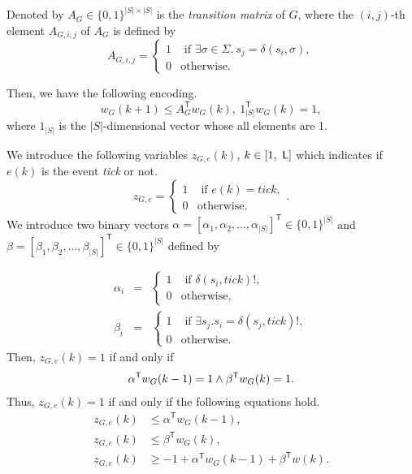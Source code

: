\documentclass{article}
\newcommand{\Len}{{\sf L}}
\begin{document}
Denoted by $A_G \in \{0, 1\}^{|S| \times |S|}$ is the \textit{transition matrix} of  $G$, where the $(i,j)$-th element $A_{G,i,j}$ of $A_G$ is defined by
\[
A_{G,i,j}=\left\{ \begin{array}{ll}
1 & \mbox{ if } \exists \sigma \in \Sigma.\ s_j=\delta(s_i, \sigma), \\
0 & \mbox{otherwise.}
\end{array} \right.
\]
 

Then, we have the following encoding.
\begin{equation}\label{w}
w_G(k+1) \leq A_{G}^{\mathsf{T}} w_G(k), \ {1}^\mathsf{T} _{|S|} w_G(k) =1, 
\end{equation}
where ${1}_{|S|}$ is the $|S|$-dimensional vector whose all elements are 1.
%
%

We introduce the following variables $z_{G,e}(k)$, $k\in[1,\ \Len]$ which indicates if $e(k)$ is the event \textit{tick} or not.
\[
z_{G,e}=\left\{ \begin{array}{ll}
1 & \mbox{ if } e(k)=tick, \\
0 & \mbox{otherwise.}
\end{array} \right. .
\]
We introduce two binary vectors $\alpha=[\alpha_1, \alpha_2,\ldots , \alpha_{|S|}]^{\mathsf{T}} \in \{0, 1\}^{{|S|}}$ and  $\beta=[\beta_1, \beta_2,\ldots , \beta_{|S|}]^{\mathsf{T}} \in \{0, 1\}^{{|S|}}$ defined by

\begin{eqnarray*}
\alpha_{i}&=&\left\{ \begin{array}{ll}
1 & \mbox{ if } \delta(s_i, tick)!, \\
0 & \mbox{otherwise,}
\end{array} \right.\\
\beta_{i}&=&\left\{ \begin{array}{ll}
1 & \mbox{ if } \exists s_j. s_i=\delta(s_j,tick)!, \\
0 & \mbox{otherwise.}
\end{array} \right.
\end{eqnarray*}
Then, $z_{G,e}(k)=1$ if and only if
\begin{align}%
\alpha^\mathsf{T} w_G (k-1) = 1 \wedge \beta^\mathsf{T} w_G (k) =1. \notag 
\end{align}
Thus, $z_{G,e}(k)=1$ if and only if the following equations hold.
\begin{align}
z_{G,e} (k) &\leq \alpha^\mathsf{T} w_G (k-1),\label{zek1} \\
z_{G,e} (k) &\leq \beta^\mathsf{T} w_G (k), \label{zek2}  \\
z_{G,e} (k) & \geq -1 + \alpha^\mathsf{T} w_G (k-1) + \beta^\mathsf{T} w (k).\label{zek3}
\end{align}
\end{document}
